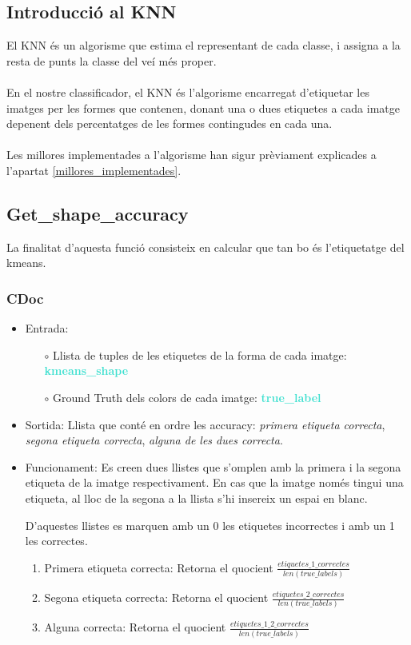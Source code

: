 \documentclass[a4paper, 11pt]{article}
\begin{document}
\subsection{Introducció al KNN}
El KNN és un algorisme que estima el representant de cada classe, i assigna a la resta de punts la classe del veí més proper.\\\\
En el nostre classificador, el KNN és l'algorisme encarregat d'etiquetar les imatges per les formes que contenen, donant una o dues etiquetes a cada imatge depenent dels percentatges de les formes contingudes en cada una.\\\\
Les millores implementades a l'algorisme han sigur prèviament explicades a l'apartat \textcolor{blue}{\ref{millores_implementades}}.
\newpage

\subsection{Get\_shape\_accuracy}
La finalitat d'aquesta funció consisteix en calcular que tan bo és l'etiquetatge del kmeans.
\subsubsection{CDoc}
\begin{itemize}
    \item Entrada: 
    \begin{itemize}
        \item[$\circ$] Llista de tuples de les etiquetes de la forma de cada imatge: \textbf{\textcolor{Turquoise}{kmeans\_shape}}
        \item[$\circ$] Ground Truth dels colors de cada imatge: \textbf{\textcolor{Turquoise}{true\_label}}
    \end{itemize}
    \item Sortida: Llista que conté en ordre les accuracy: \textit{ primera etiqueta correcta}, \textit{segona etiqueta correcta}, \textit{alguna de les dues correcta}.
    \item Funcionament: 
    Es creen dues llistes que s'omplen amb la primera i la segona etiqueta de la imatge respectivament. En cas que la imatge només tingui una etiqueta, al lloc de la segona a la llista s'hi insereix un espai en blanc.

    D'aquestes llistes es marquen amb un 0 les etiquetes incorrectes i amb un 1 les correctes.
    \begin{enumerate}
        \item Primera etiqueta correcta: Retorna el quocient $\frac{etiquetes\_1\_correctes}{len(true\_labels)}$
        \item Segona etiqueta correcta: Retorna el quocient $\frac{etiquetes\_2\_correctes}{len(true\_labels)}$
        \item Alguna correcta: Retorna el quocient $\frac{etiquetes\_1\_2\_correctes}{len(true\_labels)}$
        
    \end{enumerate}
\end{itemize}
\newpage
\end{document}
